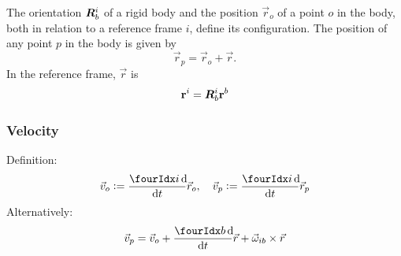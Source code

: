 \documentclass[a4paper, 12pt]{article}
\begin{document}
The orientation \(\bm{R}^i_b\) of a rigid body and the position \(\vec{r}_o\) of a point \(o\) in the body, both in relation to a reference frame \(i\), define its configuration. The position of any point \(p\) in the body is given by
\begin{equation}
	\vec{r}_p = \vec{r}_o + \vec{r}.
\end{equation}
In the reference frame, \(\vec{r}\) is
\begin{equation}
	\mathbf{r}^i = \bm{R}^i_b \mathbf{r}^b
\end{equation}

\subsubsection{Velocity}
Definition:
\begin{equation}
	\vec{v}_o := \frac{\presuper{i}\dif}{\dif t} \vec{r}_o, \quad 
	\vec{v}_p := \frac{\presuper{i}\dif}{\dif t} \vec{r}_p
\end{equation}
Alternatively:
\begin{equation}
	\vec{v}_p = \vec{v}_o + \frac{\presuper{b} \dif}{\dif t} \vec{r} + \vec{\omega}_{ib} \times \vec{r}
\end{equation}
\end{document}
